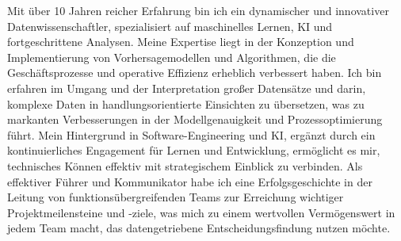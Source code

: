 %
%
%
\par{
Mit über 10 Jahren reicher Erfahrung bin ich ein dynamischer und innovativer Datenwissenschaftler, spezialisiert auf maschinelles Lernen, KI und fortgeschrittene Analysen. Meine Expertise liegt in der Konzeption und Implementierung von Vorhersagemodellen und Algorithmen, die die Geschäftsprozesse und operative Effizienz erheblich verbessert haben. Ich bin erfahren im Umgang und der Interpretation großer Datensätze und darin, komplexe Daten in handlungsorientierte Einsichten zu übersetzen, was zu markanten Verbesserungen in der Modellgenauigkeit und Prozessoptimierung führt. Mein Hintergrund in Software-Engineering und KI, ergänzt durch ein kontinuierliches Engagement für Lernen und Entwicklung, ermöglicht es mir, technisches Können effektiv mit strategischem Einblick zu verbinden. Als effektiver Führer und Kommunikator habe ich eine Erfolgsgeschichte in der Leitung von funktionsübergreifenden Teams zur Erreichung wichtiger Projektmeilensteine und -ziele, was mich zu einem wertvollen Vermögenswert in jedem Team macht, das datengetriebene Entscheidungsfindung nutzen möchte.
}
\vspace{6.6mm}
